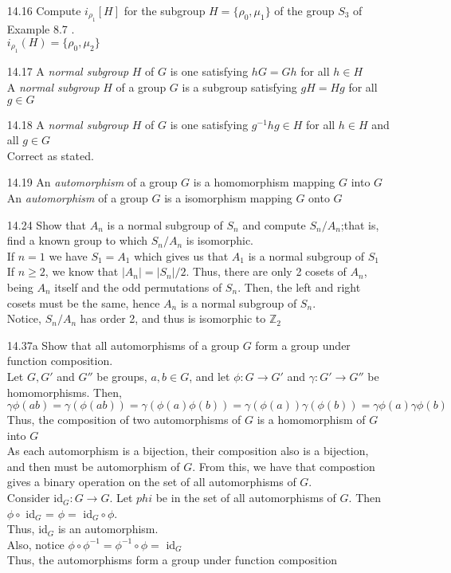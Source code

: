 \documentclass[12pt]{article}
\newcommand{\Z}{\mathds{Z}}
\begin{document}
\begin{enumerate}
	\item[14.16] Compute $i_{\rho_1}[H]$ for the subgroup $ H = \{\rho_0,\mu_1\}$ of the group $S_3$ of Example 8.7 .\\
	$i_{\rho_1}(H)=\{\rho_0,\mu_2\}$
	\item[14.17] A \textit{normal subgroup} $ H $ of $ G $ is one satisfying $hG = Gh $ for all $ h \in H$\\
	A \textit{normal subgroup} $ H $ of a group $ G $ is a subgroup satisfying $ gH = Hg $ for all $ g \in G $
	\item[14.18] A \textit{normal subgroup} $ H $ of $ G $ is one satisfying $ g^{-1}hg\in H $ for all $ h\in H $ and all $ g\in G $\\
	 Correct as stated.
	\item[14.19] An \textit{automorphism} of a group $ G $ is a homomorphism mapping $ G $ into $ G $ \\
	An \textit{automorphism} of a group $ G $ is a isomorphism mapping $ G $ onto $ G $ 
	\item[14.24] Show that $ A_n $ is a normal subgroup of $ S_n $ and compute $ S_n/A_n $;that is, find a known group to which $ S_n/A_n $ is isomorphic.\\
	If $ n =1 $ we have $ S_1=A_1 $ which gives us that $ A_1 $ is a normal subgroup of $ S_1 $\\
	If $ n \geq 2 $, we know that $ |A_n|=|S_n|/2 $. Thus, there are only 2 cosets of $ A_n $, being $ A_n $ itself and the odd permutations of $ S_n $. Then, the left and right cosets must be the same, hence $ A_n $ is a normal subgroup of $ S_n $.\\
	Notice, $ S_n/A_n $ has order 2, and thus is isomorphic to $ \Z_2 $
	\item[14.37a] Show that all automorphisms of a group $ G $ form a group under function composition.\\
	Let $ G,G' $ and $ G'' $ be groups, $ a,b\in G $, and let $ \phi : G\rightarrow G' $ and $ \gamma : G' \rightarrow G'' $ be homomorphisms. Then, 
		\[\gamma\phi(ab)=\gamma(\phi(ab))=\gamma(\phi(a)\phi(b))=\gamma(\phi(a))\gamma(\phi(b))=\gamma\phi(a)\gamma\phi(b)\]
	Thus, the composition of two automorphisms of $ G $ is a homomorphism of $ G$ into $ G $\\
	As each automorphism is a bijection, their composition also is a bijection, and then must be automorphism of $ G $. From this, we have that compostion gives a binary operation on the set
	of all automorphisms of $ G $.\\
	Consider id$_G : G \rightarrow G  $. Let $ phi $ be in the set of all automorphisms of $ G $. Then $ \phi \circ $ id$_G $ = $ \phi = $ id$_G \circ \phi $.\\
	Thus, id$_G$ is an automorphism.\\
	Also, notice $ \phi \circ \phi^{-1}=\phi^{-1}\circ\phi = $ id$_G$\\
	Thus, the automorphisms form a group under function composition
	

\end{enumerate}
\end{document}
